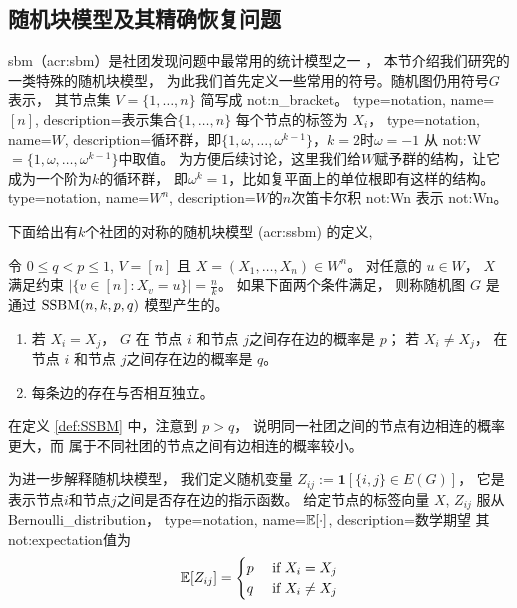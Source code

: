 \subsection{随机块模型及其精确恢复问题}\label{sec:exact_recovery}
\gls{sbm}（\gls{acr:sbm}）是社团发现问题中最常用的统计模型之一
\cite{holland1983stochastic, abbe2017community}，
本节介绍我们研究的一类特殊的随机块模型，
%
为此我们首先定义一些常用的符号。随机图仍用符号$G$表示，
其节点集 $V=\{1,\dots, n\}$ 简写成 \gls{not:n_bracket}。
{
  type=notation,
  name={\ensuremath{[n]}},
  description={表示集合$\{1,\dots, n\}$}
}
每个节点的标签为 $X_i$，
{
  type=notation,
  name={\ensuremath{W}},
  description={循环群，即$\{1, \omega, \dots, \omega^{k-1}\}$，$k=2$时$\omega=-1$}
}
从 \gls{not:W} $= \{1, \omega, \dots, \omega^{k-1}\}$中取值。
为方便后续讨论，这里我们给$W$赋予群的结构，让它成为一个阶为$k$的循环群，
即$\omega^k=1$，比如复平面上的单位根即有这样的结构。
{
  type=notation,
  name={\ensuremath{W^n}},
  description={$W$的$n$次笛卡尔积}
}
\gls{not:Wn} 表示 \glsdesc{not:Wn}。 

下面给出有$k$个社团的对称的随机块模型
(\gls{acr:ssbm})
的定义, 
	\begin{definition}\label{def:SSBM}
	令 $0\leq q<p\leq 1$, $V=[n]$ 且
  $X=(X_1,\dots,X_n)\in W^n$。 对任意的 $u\in W$，
  $X$ 满足约束
  $|\{v \in [n] : X_v = u\}| = \frac{n}{k}$。
	如果下面两个条件满足，
  则称随机图 $G$ 是通过 $\operatorname{SSBM}(n,k,p,q)$ 模型产生的。 
	\begin{enumerate}
	\item 若 $X_i=X_j$， $G$ 在 节点 $i$ 和节点 $j$之间存在边的概率是 $p$； 
 若 $X_i \neq X_j$，  在 节点 $i$ 和节点 $j$之间存在边的概率是 $q$。
	\item 每条边的存在与否相互独立。
	\end{enumerate}
\end{definition}

在定义 \ref{def:SSBM} 中，注意到 $p>q$，
说明同一社团之间的节点有边相连的概率更大，而
属于不同社团的节点之间有边相连的概率较小。

为进一步解释随机块模型，
我们定义随机变量 $Z_{ij}:=\mathbf{1}[\{i,j\} \in E(G)]$，
它是表示节点$i$和节点$j$之间是否存在边的指示函数。
给定节点的标签向量 $X$, 
$Z_{ij}$ 服从\gls{Bernoulli_distribution}，
{
  type=notation,
  name={$\operatorname{\mathbb{E}}[\cdot]$},
  description={数学期望}
}
其\glsdesc{not:expectation}值为
\begin{equation}
\operatorname{\mathbb{E}}[Z_{ij}] =
\begin{cases}
p & \textrm{ if } X_i = X_j \\ 
q & \textrm{ if }  X_i \neq X_j
\end{cases}
\end{equation}

